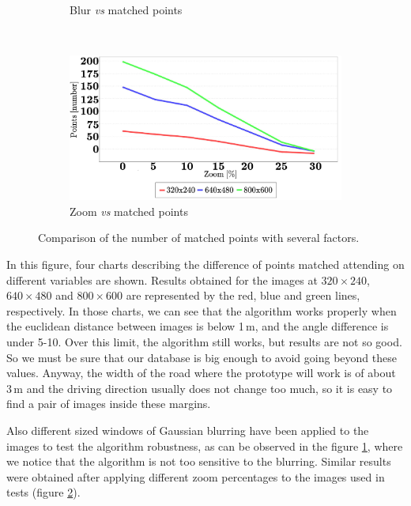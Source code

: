 \begin{figure}[t]
\begin{subfigure}[b]{0.45\textwidth}
	  \caption{Blur \emph{vs} matched points}\label{fig:cp01_blur_vs_matched}
        \end{subfigure}%
        ~
        \begin{subfigure}[b]{0.45\textwidth}
	    \includegraphics[width=\textwidth]{zoomVsMatches}
	  \caption{Zoom \emph{vs} matched points}\label{fig:cp01_zoom_vs_matched}
        \end{subfigure}%
        \caption{Comparison of the number of matched points with several factors.}\label{fig:cp01_matching_results}
\end{figure}

In this figure, four charts describing the difference of points matched attending on different variables are shown. Results obtained for the images at $320 \times 240$, $640 \times 480$ and $800 \times 600$ are represented by the red, blue and green lines, respectively. In those charts, we can see that the algorithm works properly when the euclidean distance between images is below 1\,m, and the angle difference is under 5-10\textdegree. Over this limit, the algorithm still works, but results are not so good. So we must be sure that our database is big enough to avoid going beyond these values. Anyway, the width of the road where the prototype will work is of about 3\,m and the driving direction usually does not change too much, so it is easy to find a pair of images inside these margins.

Also different sized windows of Gaussian blurring have been applied to the images to test the algorithm robustness, as can be observed in the figure \ref{fig:cp01_blur_vs_matched}, where we notice that the algorithm is not too sensitive to the blurring. Similar results were obtained after applying different zoom percentages to the images used in tests (figure \ref{fig:cp01_zoom_vs_matched}).

